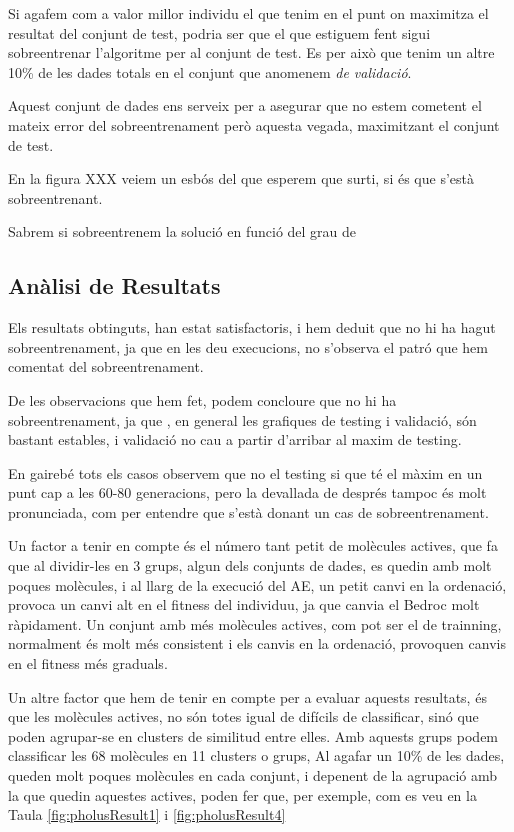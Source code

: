 \documentclass[titlepage,a4paper,12pt]{book}
\begin{document}
Si agafem com a valor millor individu el que tenim en el punt on maximitza el
resultat del conjunt de test, podria ser que el que estiguem fent sigui
sobreentrenar l'algoritme per al conjunt de test.  Es per això que tenim un
altre 10\% de les dades totals en el conjunt que anomenem \emph{de validació}. 

Aquest conjunt de dades ens serveix per a asegurar que no estem cometent el
mateix error del sobreentrenament però aquesta vegada, maximitzant el conjunt de
test.  

En la figura XXX veiem un esbós del que esperem que surti, si és que s'està
sobreentrenant.

Sabrem si sobreentrenem la solució en funció del grau de 

\subsection{Anàlisi de Resultats} %
\label{sub:Analisi de Resultats}

Els resultats obtinguts, han estat satisfactoris, i hem deduit que no hi ha
hagut sobreentrenament, ja que en les deu execucions, no s'observa el patró que
hem comentat del sobreentrenament.

De les observacions que hem fet, podem concloure que no hi ha sobreentrenament,
ja que , en general les grafiques de testing i validació, són bastant estables,
i validació no cau a partir d'arribar al maxim de testing.

En gairebé tots els casos observem que no el testing si que té el màxim en un
punt cap a les 60-80 generacions, pero la devallada de després tampoc és molt
pronunciada, com per entendre que s'està donant un cas de sobreentrenament.

Un factor a tenir en compte és el número tant petit de molècules actives, que fa
que al dividir-les en 3 grups, algun dels conjunts de dades, es quedin amb molt
poques molècules, i al llarg de la execució del AE, un petit canvi en la
ordenació, provoca un canvi alt en el fitness del individuu, ja que canvia el
Bedroc molt ràpidament.  Un conjunt amb més molècules actives, com pot ser el de
trainning, normalment és molt més consistent i els canvis en la ordenació,
provoquen canvis en el fitness més graduals.

Un altre factor que hem de tenir en compte per a evaluar aquests resultats, és
que les molècules actives, no són totes igual de difícils de classificar, sinó
que poden agrupar-se en clusters de similitud entre elles.  Amb aquests grups
podem classificar les 68 molècules en 11 clusters o grups,  Al agafar un 10\% de
les dades, queden molt poques molècules en cada conjunt, i depenent de la
agrupació amb la que quedin aquestes actives, poden fer que, per exemple, com es
veu en la Taula \ref{fig:pholusResult1} i \ref{fig:pholusResult4}
\end{document}
